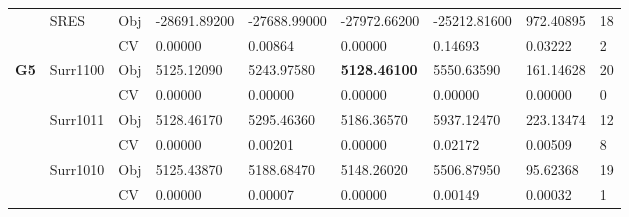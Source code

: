 \begin{table*}[!htb]
\begin{tabular}{lllllllll}
		& SRES                               & Obj                                & -28691.89200                       & -27688.99000                       & -27972.66200                         & -25212.81600                        & 972.40895                         & 18               \\
		&                                    & CV                                 & 0.00000                            & 0.00864                            & 0.00000                              & 0.14693                             & 0.03222                           & 2                \\ \hline
		\multirow{16}{*}{\textbf{G5}}           & Surr1100                           & Obj                                & 5125.12090                         & 5243.97580                         & \textbf{5128.46100}                           & 5550.63590                          & 161.14628                         & 20               \\
		&                                    & CV                                 & 0.00000                            & 0.00000                            & 0.00000                              & 0.00000                             & 0.00000                           & 0                \\
		& Surr1011                           & Obj                                & 5128.46170                         & 5295.46360                         & 5186.36570                           & 5937.12470                          & 223.13474                         & 12               \\
		&                                    & CV                                 & 0.00000                            & 0.00201                            & 0.00000                              & 0.02172                             & 0.00509                           & 8                \\
		& Surr1010                           & Obj                                & 5125.43870                         & 5188.68470                         & 5148.26020                           & 5506.87950                          & 95.62368                          & 19               \\
		&                                    & CV                                 & 0.00000                            & 0.00007                            & 0.00000                              & 0.00149                             & 0.00032                           & 1                \\

\end{tabular}
\end{table*}
